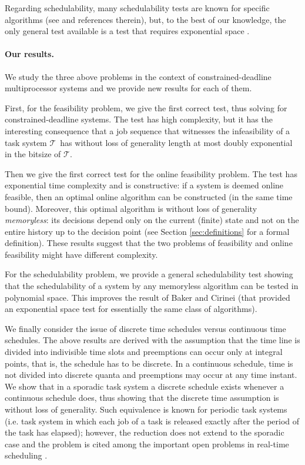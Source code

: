 \documentclass{llncs}
\newcommand{\tsys}{\ensuremath{\mathcal{T}}}
\begin{document}
Regarding schedulability, many schedulability tests are known for specific algorithms (see \cite{Baker:2007} and references therein), but, to the best of our knowledge, the only general test available is a test that requires exponential space  \cite{Baker:2007:b}.  





\paragraph{Our results.}
We study the three above problems in the context of constrained-deadline multiprocessor systems and we provide new  results for each of them.

First, for the feasibility problem, we give the first correct test, thus solving \cite[Open Problem 3]{Baruah:2009:open} for constrained-deadline systems. The test has high complexity, but it has the interesting consequence that a job sequence that witnesses the infeasibility of a task system \tsys\ has without loss of generality length at most doubly exponential in the bitsize of \tsys. 

Then we give the first correct test for the online feasibility problem. The test has exponential time complexity and is constructive: if a system is deemed online feasible, then an optimal online algorithm can be constructed (in the same time bound). Moreover, this optimal algorithm is without loss of generality \emph{memoryless}: its decisions depend only on the current (finite) state and not on the entire history up to the decision point (see Section \ref{sec:definitions} for a formal definition). These results suggest that the two problems of feasibility and online feasibility might have different complexity.

For the schedulability problem, we provide a general schedulability test showing that the schedulability of a system by any memoryless algorithm can be tested in polynomial space. This improves the result of Baker and Cirinei \cite{Baker:2007:b} (that provided an exponential space test for essentially the same class of algorithms).


We finally consider the issue of discrete time schedules versus continuous time schedules. The above results are derived with the assumption that the time line is divided into indivisible time slots and preemptions can occur only at integral points, that is, the schedule has to be discrete. In a continuous schedule, time is not divided into discrete quanta and preemptions may occur at any time instant. We show that in a sporadic task system a discrete schedule exists whenever a continuous schedule does, thus showing that the discrete time assumption is without loss of generality. Such  equivalence is known for periodic task systems (i.e. task system in which each job of a task is released exactly after the period  of the task has elapsed); however, the reduction does not extend to the sporadic case and the problem is cited among the important open problems in real-time scheduling  \cite[Open Problem 5]{Baruah:2009:open}. 
\end{document}
